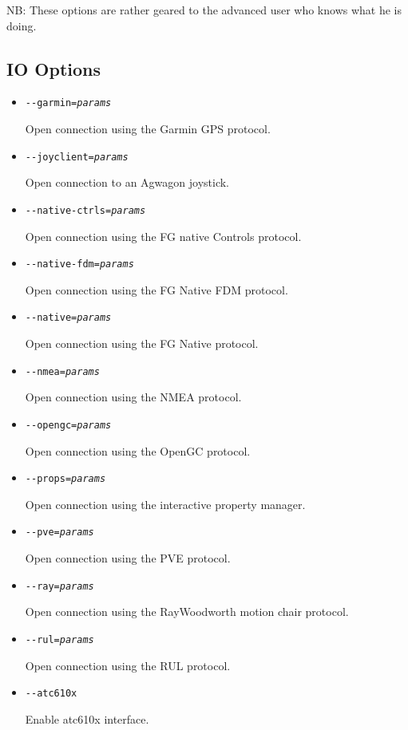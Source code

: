 NB: These options are rather geared to the advanced user who knows what he is doing.

\subsection{IO Options}
\begin{itemize}
\item{\texttt{-$ $-garmin={\it params}}}

  Open connection using the Garmin GPS protocol.

\item{\texttt{-$ $-joyclient={\it params}}}

  Open connection to an Agwagon joystick.

\item{\texttt{-$ $-native-ctrls={\it params}}}

  Open connection using the FG native Controls protocol.

\item{\texttt{-$ $-native-fdm={\it params}}}

  Open connection using the FG Native FDM protocol.

\item{\texttt{-$ $-native={\it params}}}

  Open connection using the FG Native protocol.

\item{\texttt{-$ $-nmea={\it params}}}

  Open connection using the NMEA protocol.

\item{\texttt{-$ $-opengc={\it params}}}

  Open connection using the OpenGC protocol.

\item{\texttt{-$ $-props={\it params}}}

  Open connection using the interactive property manager.

\item{\texttt{-$ $-pve={\it params}}}

  Open connection using the PVE protocol.

\item{\texttt{-$ $-ray={\it params}}}

  Open connection using the RayWoodworth motion chair protocol.

\item{\texttt{-$ $-rul={\it params}}}

  Open connection using the RUL protocol.

\item{\texttt{-$ $-atc610x}}

  Enable atc610x interface.
\end{itemize}

